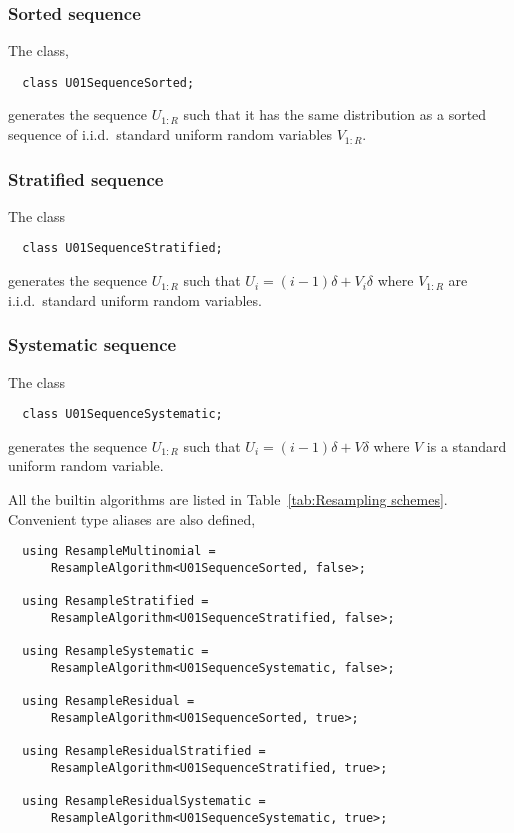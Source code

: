 \subsubsection{Sorted sequence}

The class,
\begin{Verbatim}
  class U01SequenceSorted;
\end{Verbatim}
generates the sequence $U_{1:R}$ such that it has the same distribution as a
sorted sequence of i.i.d.\ standard uniform random variables $V_{1:R}$.

\subsubsection{Stratified sequence}

The class
\begin{Verbatim}
  class U01SequenceStratified;
\end{Verbatim}
generates the sequence $U_{1:R}$ such that $U_i = (i - 1)\delta + V_i\delta$
where $V_{1:R}$ are i.i.d.\ standard uniform random variables.

\subsubsection{Systematic sequence}

The class
\begin{Verbatim}
  class U01SequenceSystematic;
\end{Verbatim}
generates the sequence $U_{1:R}$ such that $U_i = (i - 1)\delta + V\delta$
where $V$ is a standard uniform random variable.

All the builtin algorithms are listed in Table~\ref{tab:Resampling schemes}.
Convenient type aliases are also defined,
\begin{Verbatim}
  using ResampleMultinomial =
      ResampleAlgorithm<U01SequenceSorted, false>;

  using ResampleStratified =
      ResampleAlgorithm<U01SequenceStratified, false>;

  using ResampleSystematic =
      ResampleAlgorithm<U01SequenceSystematic, false>;

  using ResampleResidual =
      ResampleAlgorithm<U01SequenceSorted, true>;

  using ResampleResidualStratified =
      ResampleAlgorithm<U01SequenceStratified, true>;

  using ResampleResidualSystematic =
      ResampleAlgorithm<U01SequenceSystematic, true>;
\end{Verbatim}

